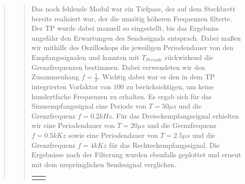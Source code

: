 \begin{quote}
\begin{quote}
                Das noch fehlende Modul war ein Tiefpass, der auf dem
                Steckbrett bereits realisiert war, der die unnötig höheren
                Frequenzen filterte.
                Der TP wurde dabei manuell so eingestellt, bis das Ergebniss ungefähr 
                den Erwartungen des Sendesignals entsprach. Dabei maßen wir
                mithilfe des Oszilloskops die jeweiligen Periodendauer von den
                Empfangssignalen und konnten mit $T_{Periode}$ rückwirkend die
                Grenzfrequenzen bestimmen. Dabei verwendeten wir den
                Zusammenhang $f = \frac{1}{T}$. Wichtig dabei war es den in dem
                TP integrierten Vorfaktor von $100$ zu berücksichtigen, um keine 
                hundertfache Frequenzen zu erhalten. Es ergab sich für das
                Sinusempfangssignal eine Periode von $T = 50\mu s$ und die
                Grenzfrequenz $f = 0.2 kHz$. Für das Dreieckempfangssignal
                erhielten wir eine Periodendauer von $T = 20\mu s$ und die Grenzfrequenz
                $f = 0.5 kKz$ sowie eine Periodendauer von $T = 2.5\mu s$ und
                die Grenzfrequenz $f = 4 kKz$ für das Rechteckempfangssignal.
                Die Ergebnisse nach der Filterung wurden ebenfalls geplottet und
                erneut mit dem ursprünglichen Sendesignal verglichen.
                
                \begin{center}
            \begin{tabular}{ll}

            \hspace{-14em}
                \begin{minipage}{0.6\textwidth}


\end{minipage}
\end{tabular}
\end{center}
\end{quote}
\end{quote}

